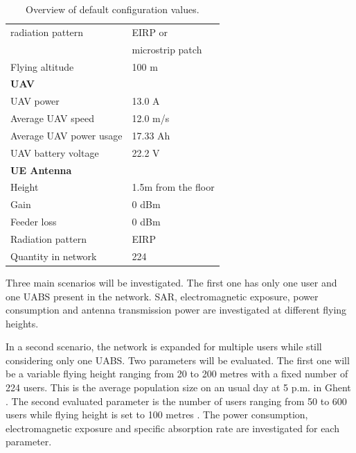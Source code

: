 \documentclass[twocolumn]{phdsymp} %
\begin{document}
\begin{table}[!htb]
\begin{tabular}[t]{ll}
        \hspace{3mm}  radiation pattern                   & EIRP or\\
         \hspace{3mm}                                     & microstrip patch\\
        \hspace{3mm}  Flying altitude                     & 100 m  \\
        \hline
        \multicolumn{2}{l}{\textbf{UAV}} \\
        \hline  
        \hspace{3mm}  UAV power                           & 13.0 A   \\
        \hspace{3mm}  Average UAV speed                   & 12.0 m/s \\
        \hspace{3mm}  Average UAV power usage             & 17.33 Ah    \\
        \hspace{3mm}  UAV battery voltage                 & 22.2 V \\
        \hline
        \multicolumn{2}{l}{\textbf{\acs{UE} Antenna}} \\
        \hline 
        \hspace{3mm} Height                     & 1.5m from the floor       \\ 
        \hspace{3mm} Gain                      & 0 dBm   \\ 
        \hspace{3mm} Feeder loss               & 0 dBm   \\ 
        \hspace{3mm} Radiation pattern         & \acs{EIRP}  \\
        \hspace{3mm} Quantity in network                & 224  \\
        \toprule
\end{tabular}
\caption{Overview of default configuration values.}
\label{table:defaultconf}
\end{table}
 
Three main scenarios will be investigated. 
The first one has only one user and one \gls{UABS} present in the network. 
SAR, electromagnetic exposure, power consumption 
and antenna transmission power are investigated at different flying heights.

In a second scenario, the network is expanded for multiple users while still considering only one \gls{UABS}. 
Two parameters will be evaluated. The first one will be a variable flying height ranging from 
20 to 200 metres with a fixed
number of 224 users. This is the average population size on an usual day at 5 p.m. in Ghent \cite{J2}.
The second evaluated parameter is the number of users ranging from 50 to 600 users
while flying height is set to 100 metres \cite{J2}.
The power consumption, electromagnetic exposure and specific 
absorption rate are investigated for each parameter.
\end{document}
